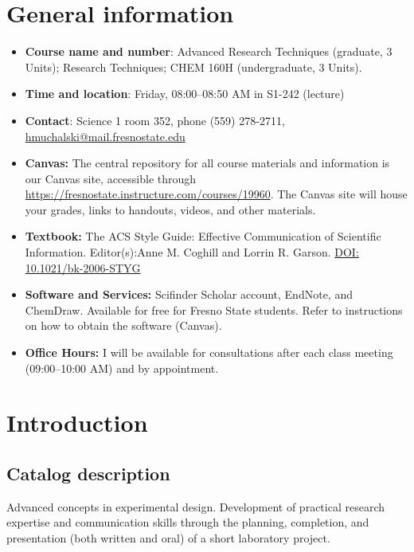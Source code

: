 \hypertarget{general-information}{%
\section{General information}\label{general-information}}

\begin{itemize}
\tightlist
\item
  \textbf{Course name and number}: Advanced Research Techniques
  (graduate, 3 Units); Research Techniques; CHEM 160H (undergraduate, 3
  Units).
\item
  \textbf{Time and location}: Friday, 08:00--08:50 AM in S1-242
  (lecture)
\item
  \textbf{Contact}: Science 1 room 352, phone (559) 278-2711,
  \url{hmuchalski@mail.fresnostate.edu}
\item
  \textbf{Canvas:} The central repository for all course materials and
  information is our Canvas site, accessible through
  \url{https://fresnostate.instructure.com/courses/19960}. The Canvas
  site will house your grades, links to handouts, videos, and other
  materials.
\item
  \textbf{Textbook:} The ACS Style Guide: Effective Communication of
  Scientific Information. Editor(s):Anne M. Coghill and Lorrin R.
  Garson.
  \href{http://login.hmlproxy.lib.csufresno.edu/login?url=http://dx.doi.org/10.1021/bk-2006-STYG}{DOI:
  10.1021/bk-2006-STYG}
\item
  \textbf{Software and Services:} Scifinder Scholar account, EndNote,
  and ChemDraw. Available for free for Fresno State students. Refer to
  instructions on how to obtain the software (Canvas).
\item
  \textbf{Office Hours:} I will be available for consultations after
  each class meeting (09:00--10:00 AM) and by appointment.
\end{itemize}

\hypertarget{introduction}{%
\section{Introduction}\label{introduction}}

\hypertarget{catalog-description}{%
\subsection{Catalog description}\label{catalog-description}}

Advanced concepts in experimental design. Development of practical
research expertise and communication skills through the planning,
completion, and presentation (both written and oral) of a short
laboratory project.


